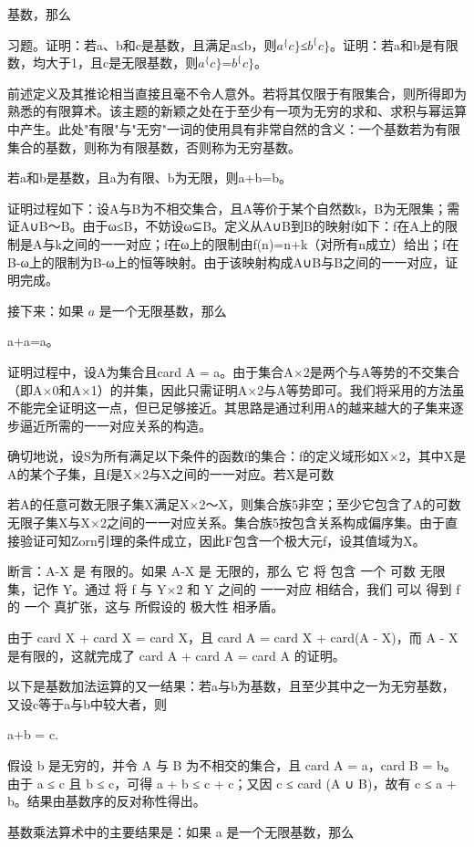 \documentclass[12pt,a4paper]{ctexbook}
\theoremstyle{definition}
\theoremstyle{remark}
\begin{document}
{基数，那么

习题。证明：若a、b和c是基数，且满足a≤b，则$a^\{c\}$≤$b^\{c\}$。证明：若a和b是有限数，均大于1，且c是无限基数，则$a^\{c\}$=$b^\{c\}$。

前述定义及其推论相当直接且毫不令人意外。若将其仅限于有限集合，则所得即为熟悉的有限算术。该主题的新颖之处在于至少有一项为无穷的求和、求积与幂运算中产生。此处"有限"与"无穷"一词的使用具有非常自然的含义：一个基数若为有限集合的基数，则称为有限基数，否则称为无穷基数。

若a和b是基数，且a为有限、b为无限，则a+b=b。

证明过程如下：设A与B为不相交集合，且A等价于某个自然数k，B为无限集；需证A∪B～B。由于ω≤B，不妨设ω⊆B。定义从A∪B到B的映射f如下：f在A上的限制是A与k之间的一一对应；f在ω上的限制由f(n)=n+k（对所有n成立）给出；f在B-ω上的限制为B-ω上的恒等映射。由于该映射构成A∪B与B之间的一一对应，证明完成。

接下来：如果 $a$ 是一个无限基数，那么

a+a=a。

证明过程中，设A为集合且card A = a。由于集合A×2是两个与A等势的不交集合（即A×{0}和A×{1}）的并集，因此只需证明A×2与A等势即可。我们将采用的方法虽不能完全证明这一点，但已足够接近。其思路是通过利用A的越来越大的子集来逐步逼近所需的一一对应关系的构造。

确切地说，设S为所有满足以下条件的函数f的集合：f的定义域形如X×2，其中X是A的某个子集，且f是X×2与X之间的一一对应。若X是可数

若A的任意可数无限子集X满足X×2～X，则集合族5非空；至少它包含了A的可数无限子集X与X×2之间的一一对应关系。集合族5按包含关系构成偏序集。由于直接验证可知Zorn引理的条件成立，因此F包含一个极大元f，设其值域为X。

断言：A-X 是 有限的。如果 A-X 是 无限的，那么 它 将 包含 一个 可数 无限 集，记作 Y。通过 将 f 与 Y×2 和 Y 之间的 一一对应 相结合，我们 可以 得到 f 的 一个 真扩张，这与 所假设的 极大性 相矛盾。

由于 card X + card X = card X，且 card A = card X + card(A - X)，而 A - X 是有限的，这就完成了 card A + card A = card A 的证明。

以下是基数加法运算的又一结果：若a与b为基数，且至少其中之一为无穷基数，又设c等于a与b中较大者，则

a+b = c.

假设 b 是无穷的，并令 A 与 B 为不相交的集合，且 card A = a，card B = b。由于 a ≤ c 且 b ≤ c，可得 a + b ≤ c + c；又因 c ≤ card (A ∪ B)，故有 c ≤ a + b。结果由基数序的反对称性得出。

基数乘法算术中的主要结果是：如果 a 是一个无限基数，那么

}
\end{document}
